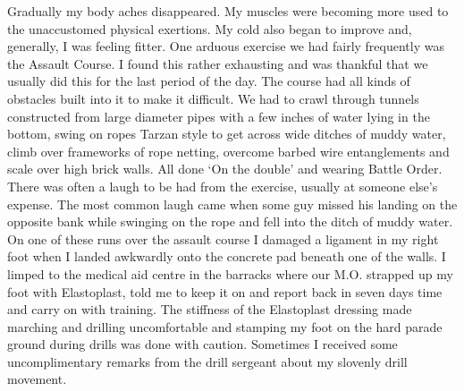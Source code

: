 Gradually my body aches disappeared. My muscles were becoming more
used to the unaccustomed physical exertions. My cold also began to
improve and, generally, I was feeling fitter. One arduous exercise we
had fairly frequently was the Assault Course. I found this rather
exhausting and was thankful that we usually did this for the last
period of the day. The course had all kinds of obstacles built into
it to make it difficult. We had to crawl through tunnels constructed
from large diameter pipes with a few inches of water lying in the
bottom, swing on ropes Tarzan style to get across wide ditches of
muddy water, climb over frameworks of rope netting, overcome barbed
wire entanglements and scale over high brick walls. All done `On the
double' and wearing Battle Order. There was often a laugh to be had
from the exercise, usually at someone else's expense. The most common
laugh came when some guy missed his landing on the opposite bank while
swinging on the rope and fell into the ditch of muddy water. On one
of these runs over the assault course I damaged a ligament in my right
foot when I landed awkwardly onto the concrete pad beneath one of the
walls. I limped to the medical aid centre in the barracks where our
M.O. strapped up my foot with Elastoplast, told me to keep it on and
report back in seven days time and carry on with training. The
stiffness of the Elastoplast dressing made marching and drilling
uncomfortable and stamping my foot on the hard parade ground during
drills was done with caution. Sometimes I received some
uncomplimentary remarks from the drill sergeant about my slovenly
drill movement.

